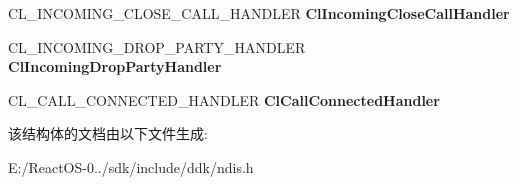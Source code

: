 \begin{DoxyCompactItemize}
\item 
\mbox{\label{struct___n_d_i_s___c_l_i_e_n_t___c_h_a_r_a_c_t_e_r_i_s_t_i_c_s_a0a4aae2385e7349e04f97155414630f8}} 
C\+L\+\_\+\+I\+N\+C\+O\+M\+I\+N\+G\+\_\+\+C\+L\+O\+S\+E\+\_\+\+C\+A\+L\+L\+\_\+\+H\+A\+N\+D\+L\+ER {\bfseries Cl\+Incoming\+Close\+Call\+Handler}
\item 
\mbox{\label{struct___n_d_i_s___c_l_i_e_n_t___c_h_a_r_a_c_t_e_r_i_s_t_i_c_s_af258c48f1b3699666b2f9fe12b0a8894}} 
C\+L\+\_\+\+I\+N\+C\+O\+M\+I\+N\+G\+\_\+\+D\+R\+O\+P\+\_\+\+P\+A\+R\+T\+Y\+\_\+\+H\+A\+N\+D\+L\+ER {\bfseries Cl\+Incoming\+Drop\+Party\+Handler}
\item 
\mbox{\label{struct___n_d_i_s___c_l_i_e_n_t___c_h_a_r_a_c_t_e_r_i_s_t_i_c_s_aa2e6b29a42e0a64a4caa40159f33e5f4}} 
C\+L\+\_\+\+C\+A\+L\+L\+\_\+\+C\+O\+N\+N\+E\+C\+T\+E\+D\+\_\+\+H\+A\+N\+D\+L\+ER {\bfseries Cl\+Call\+Connected\+Handler}
\end{DoxyCompactItemize}


该结构体的文档由以下文件生成\+:\begin{DoxyCompactItemize}
\item 
E\+:/\+React\+O\+S-\/0../sdk/include/ddk/ndis.\+h\end{DoxyCompactItemize}
